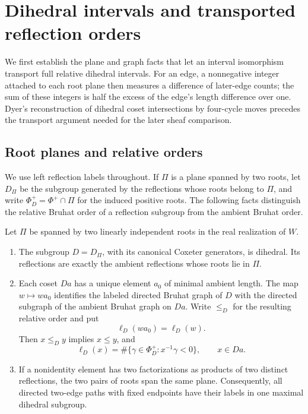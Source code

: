 \section{Dihedral intervals and transported reflection orders}
\label{sec:dihedral}

We first establish the plane and graph facts that let an interval
isomorphism transport full relative dihedral intervals. For an edge, a
nonnegative integer attached to each root plane then measures a difference
of later-edge counts; the sum of these integers is half the excess of the
edge's length difference over one. Dyer's reconstruction of dihedral coset
intersections by four-cycle moves \cite[Section~3.4]{Dyer91} precedes the
transport argument needed for the later sheaf comparison.

\subsection{Root planes and relative orders}

We use left reflection labels throughout.  If $\Pi$ is a plane spanned by
two roots, let $D_\Pi$ be the subgroup generated by the reflections whose
roots belong to $\Pi$, and write $\Phi_D^+=\Phi^+\cap\Pi$ for the
induced positive roots.  The following facts distinguish the relative
Bruhat order of a reflection subgroup from the ambient Bruhat order.

\begin{lemma}\label{dih:plane}
Let $\Pi$ be spanned by two linearly independent roots in the real
realization of $W$.
\begin{enumerate}
\item The subgroup $D=D_\Pi$, with its canonical Coxeter generators,
is dihedral.  Its reflections are exactly the ambient reflections whose
roots lie in $\Pi$.
\item Each coset $D a$ has a unique element $a_0$ of minimal ambient
length.  The map $w\mapsto wa_0$ identifies the labeled directed Bruhat
graph of $D$ with the directed subgraph of the ambient Bruhat graph on
$D a$.  Write $\le_D$ for the resulting relative order and put
\[
 \ell_D(wa_0)=\ell_D(w).
\]
Then $x\le_D y$ implies $x\le y$, and
\[
 \ell_D(x)
 =\#\{\gamma\in\Phi_D^+:x^{-1}\gamma<0\},
 \qquad x\in D a.
\]
\item If a nonidentity element has two factorizations as products of
two distinct reflections, the two pairs of roots span the same plane.
Consequently, all directed two-edge paths with fixed endpoints have
their labels in one maximal dihedral subgroup.
\end{enumerate}
\end{lemma}

